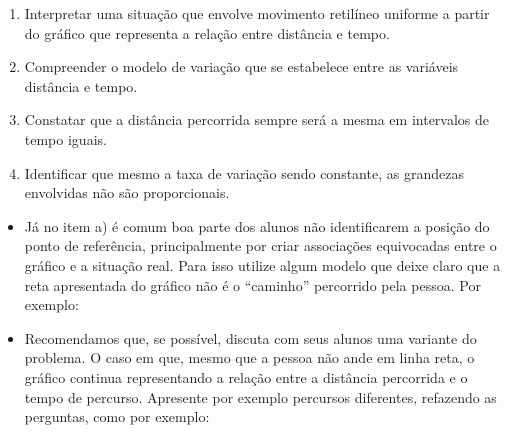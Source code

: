\documentclass[10 pt,usenames,dvipsnames, oneside]{article}
\begin{document}
\begin{goals}
\begin{enumerate}

\item Interpretar uma situação que envolve movimento retilíneo uniforme a partir do gráfico que representa a relação entre distância e tempo.
\item Compreender o modelo de variação que se estabelece entre as variáveis distância e tempo.
\item Constatar que a distância percorrida sempre será a mesma em intervalos de tempo iguais.
\item Identificar que mesmo a taxa de variação sendo constante, as grandezas envolvidas não são proporcionais.
\end{enumerate}


\tcblower


\begin{itemize}
\item Já no item a) é comum boa parte dos alunos não identificarem a posição do ponto de referência, principalmente por criar associações equivocadas entre o gráfico e a situação real. Para isso utilize algum modelo que deixe claro que a reta apresentada do gráfico não é o “caminho” percorrido pela pessoa. Por exemplo:

\begin{figure}[H]
\centering

\end{figure}

\item Recomendamos que, se possível, discuta com seus alunos uma variante do problema. O caso em que, mesmo que a pessoa não ande em linha reta, o gráfico continua representando a relação entre a distância percorrida e o tempo de percurso. Apresente por exemplo percursos diferentes, refazendo as perguntas, como por exemplo:

\begin{figure}[H]
\centering
\usetikzlibrary{arrows.meta}


\end{figure}
\end{itemize}
\end{goals}
\end{document}
